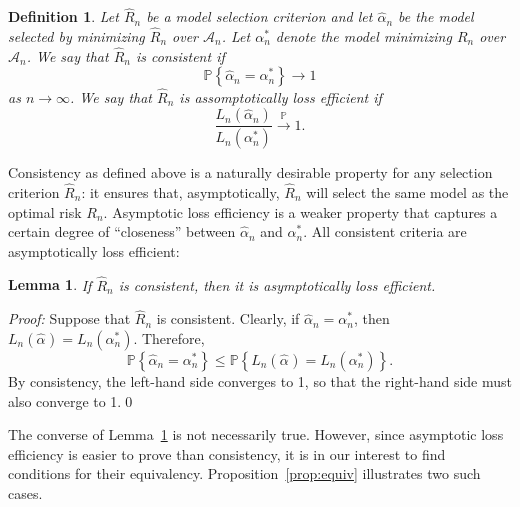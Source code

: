 \documentclass[11pt, letter paper]{article}
\newcommand{\1}{\mathmybb{1}}
\newtheorem{definition}{Definition}[section]
\newtheorem{lemma}[proposition]{Lemma}
\newcommand{\0}{\emptyset}
\newcommand{\prob}{\mathbb{P}}
\newcommand{\paren}[1]{\left(#1 \right)}
\newcommand{\set}[1]{\left\{ #1 \right\}}
\newcommand{\Acal}{\mathcal{A}_{n}}
\newcommand{\Loss}[1]{L_{n}\paren{#1}}
\newcommand{\alphahat}[1]{\hat{\alpha}^{#1}}
\begin{document}
\begin{definition}\label{def:consistency97}
    Let \(\hat{R}_{n}\) be a model selection criterion and let \(\alphahat{}_{n}\) be the model selected by minimizing \(\hat{R}_{n}\) over \(\Acal\). Let \(\alpha^{*}_{n}\) denote the model minimizing \(R_{n}\) over \(\Acal\). We say that \(\hat{R}_{n}\) is {consistent} if 
    \[\prob\set{\alphahat{}_{n} = \alpha^{*}_{n}}\to 1\]
    as \(n\to\infty\). We say that \(\hat{R}_{n}\) is {assomptotically loss efficient} if 
    \[\frac{L_{n}(\alphahat{}_{n})}{L_{n}(\alpha^{*}_{n})}\xrightarrow{\prob} 1.\]
\end{definition}

Consistency as defined above is a naturally desirable property for any selection criterion \(\hat{R}_{n}\): it ensures that, asymptotically, \(\hat{R}_{n}\) will select the same model as the optimal risk \(R_{n}\). Asymptotic loss efficiency is a weaker property that captures a certain degree of ``closeness'' between \(\alphahat{}_{n}\) and \(\alpha^{*}_{n}\). All consistent criteria are asymptotically loss efficient:

\begin{lemma}\label{lemm:implication}
    If \(\hat{R}_{n}\) is consistent, then it is asymptotically loss efficient.
\end{lemma}

\begin{myproofbox}
    \textit{Proof: }
    Suppose that \(\hat{R}_{n}\) is consistent. Clearly, if \(\alphahat{}_{n} = \alpha^{*}_{n}\), then \(\Loss{\alphahat{}} = \Loss{\alpha^{*}_{n}}\). Therefore, 
    \[\prob\set{\alphahat{}_{n} = \alpha^{*}_{n}}\leq \prob\set{\Loss{\alphahat{}} = \Loss{\alpha^{*}_{n}}}.\]
    By consistency, the left-hand side converges to 1, so that the right-hand side must also converge to 1.\qed{}
\end{myproofbox}

The converse of Lemma~\ref{lemm:implication} is not necessarily true. However, since asymptotic loss efficiency is easier to prove than consistency, it is in our interest to find conditions for their equivalency. Proposition~\ref{prop:equiv} illustrates two such cases.
\end{document}
